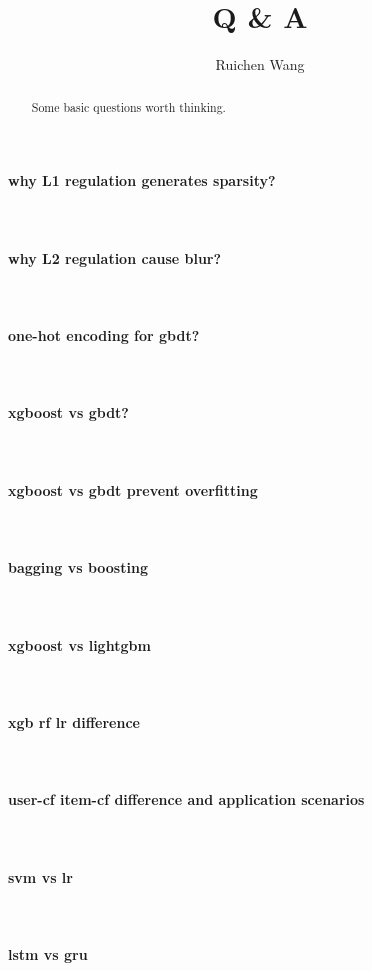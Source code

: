 \documentclass{article}
\author{Ruichen Wang}
\title{Q \& A}
\begin{document}
\maketitle
\begin{abstract}
Some basic questions worth thinking.
\end{abstract}
\noindent
\paragraph{why L1 regulation generates sparsity?}~{}
\paragraph{why L2 regulation cause blur?}~{}
\paragraph{one-hot encoding for gbdt?}~{}
\paragraph{xgboost vs gbdt?}~{}
\paragraph{xgboost vs gbdt prevent overfitting}~{}
\paragraph{bagging vs boosting}~{}
\paragraph{xgboost vs lightgbm}~{}
\paragraph{xgb rf lr difference}~{}
\paragraph{user-cf item-cf difference and application scenarios}~{}
\paragraph{svm vs lr}~{}
\paragraph{lstm vs gru}~{}
\end{document}
